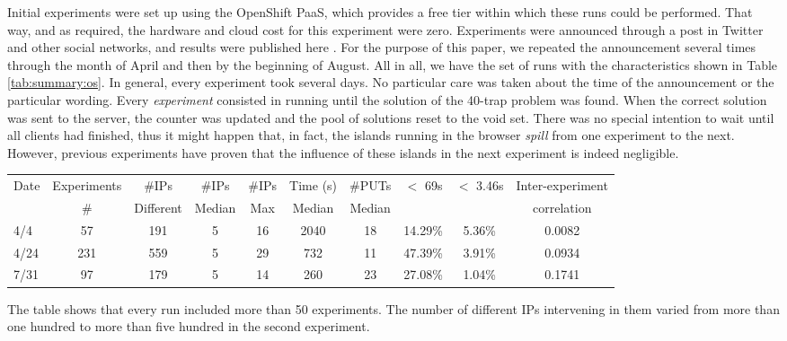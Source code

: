 \documentclass[journal,onecolumn]{IEEEtran}
\begin{document}
Initial experiments were set up using the OpenShift
PaaS, which provides a free tier within which these runs could be performed. That way, and as required, the hardware
and cloud cost for this experiment were zero. Experiments were
announced through a post in Twitter and other social networks, and
results were published here \cite{DBLP:conf/gecco/GuervosG15}. For the
purpose of this paper, we repeated the announcement several times
through the month of April and then by the beginning of August. All
in all, we have the set of runs with the characteristics shown in
Table \ref{tab:summary:os}. In general, every experiment took several
days. No particular care was taken about the time of the announcement
or the particular wording. Every {\em experiment} consisted in running
until the solution of the 40-trap problem was found. When the correct
solution was sent to the server, the counter was updated and the pool
of solutions reset to the void set. There was no special intention to wait
until all clients had finished, thus it might happen that, in fact,
the islands running in the browser {\em spill} from one experiment to
the next. However, previous experiments have proven that the influence
of these islands in the next experiment is indeed negligible.
%
\begin{table*}
\caption{Summary of time per run, number of IPs and number of PUTs per IP in the initial runs. \label{tab:summary:os}}
\begin{center}
\begin{tabular}{l|ccccccccc}
\hline
Date & Experiments &\#IPs &\#IPs &  \#IPs & Time (s) &  \#PUTs & $<$ 69s & $<$ 3.46s & Inter-experiment\\
     & \# & Different & Median & Max & Median &  Median & & & correlation \\ 
\hline
4/4 & 57 & 191 & 5 & 16 & 2040 & 18 & 14.29\% & 5.36\% & 0.0082 \\
4/24 & 231 & 559 & 5 & 29 & 732 & 11 & 47.39\% & 3.91\% & 0.0934\\
7/31 & 97 & 179 & 5 & 14 & 260 & 23 & 27.08\% & 1.04\%  & 0.1741\\
\hline
\end{tabular}
\end{center}
\end{table*}
%
The table shows that every run included more than 50 experiments. The
number of different IPs intervening in them varied from more than one
hundred to more than five hundred in the second experiment.
\end{document}

